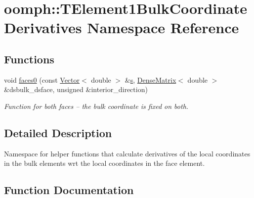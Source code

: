 \hypertarget{namespaceoomph_1_1TElement1BulkCoordinateDerivatives}{}\section{oomph\+:\+:T\+Element1\+Bulk\+Coordinate\+Derivatives Namespace Reference}
\label{namespaceoomph_1_1TElement1BulkCoordinateDerivatives}
\subsection*{Functions}
\begin{DoxyCompactItemize}
\item 
void \hyperlink{namespaceoomph_1_1TElement1BulkCoordinateDerivatives_a5677b748519a7c79c723143de940a6df}{faces0} (const \hyperlink{classoomph_1_1Vector}{Vector}$<$ double $>$ \&\hyperlink{cfortran_8h_ab7123126e4885ef647dd9c6e3807a21c}{s}, \hyperlink{classoomph_1_1DenseMatrix}{Dense\+Matrix}$<$ double $>$ \&dsbulk\+\_\+dsface, unsigned \&interior\+\_\+direction)
\begin{DoxyCompactList}\small\item\em Function for both faces -- the bulk coordinate is fixed on both. \end{DoxyCompactList}\end{DoxyCompactItemize}


\subsection{Detailed Description}
Namespace for helper functions that calculate derivatives of the local coordinates in the bulk elements wrt the local coordinates in the face element. 

\subsection{Function Documentation}
\mbox{\label{namespaceoomph_1_1TElement1BulkCoordinateDerivatives_a5677b748519a7c79c723143de940a6df}} 
